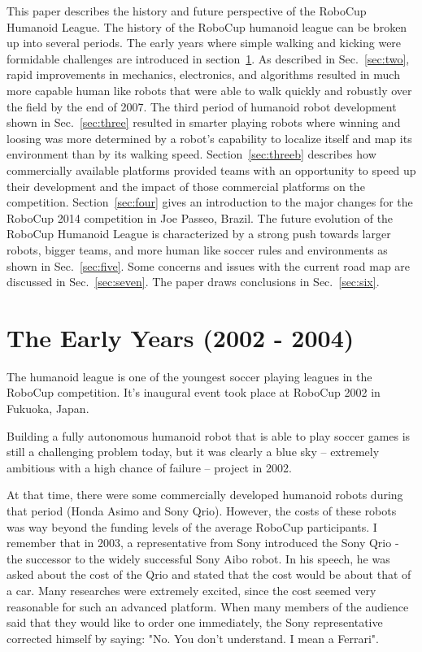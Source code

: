 \documentclass{llncs}
\begin{document}
This paper describes the history and future perspective of the RoboCup
Humanoid League. The history of the RoboCup humanoid league can be
broken up into several periods. The early years where simple walking
and kicking were formidable challenges are introduced in
section~\ref{sec:one}. As described in Sec.~\ref{sec:two}, rapid
improvements in mechanics, electronics, and algorithms resulted in
much more capable human like robots that were able to walk quickly and
robustly over the field by the end of 2007. The third period of
humanoid robot development shown in Sec.~\ref{sec:three} resulted in
smarter playing robots where winning and loosing was more determined
by a robot's capability to localize itself and map its environment
than by its walking speed. Section~\ref{sec:threeb} describes how
commercially available platforms provided teams with an opportunity to
speed up their development and the impact of those commercial
platforms on the competition.  Section~\ref{sec:four} gives an
introduction to the major changes for the RoboCup 2014 competition in
Joe Passeo, Brazil. The future evolution of the RoboCup Humanoid
League is characterized by a strong push towards larger robots, bigger
teams, and more human like soccer rules and environments as shown in
Sec.~\ref{sec:five}. Some concerns and issues with the current road
map are discussed in Sec.~\ref{sec:seven}. The paper draws conclusions
in Sec.~\ref{sec:six}.

\section{The Early Years (2002 - 2004)}
\label{sec:one}

The humanoid league is one of the youngest soccer playing leagues in
the RoboCup competition. It's inaugural event took place at RoboCup
2002 in Fukuoka, Japan.

Building a fully autonomous humanoid robot that is able to play soccer
games is still a challenging problem today, but it was clearly a blue
sky -- extremely ambitious with a high chance of failure -- project in
2002. 

At that time, there were some commercially developed humanoid robots
during that period (Honda Asimo and Sony Qrio). However, the costs of
these robots was way beyond the funding levels of the average RoboCup
participants. I remember that in 2003, a representative from Sony
introduced the Sony Qrio - the successor to the widely successful Sony
Aibo robot. In his speech, he was asked about the cost of the Qrio and
stated that the cost would be about that of a car. Many researches
were extremely excited, since the cost seemed very reasonable for such
an advanced platform. When many members of the audience said that they
would like to order one immediately, the Sony representative corrected
himself by saying: "No. You don't understand. I mean a Ferrari".
\end{document}
